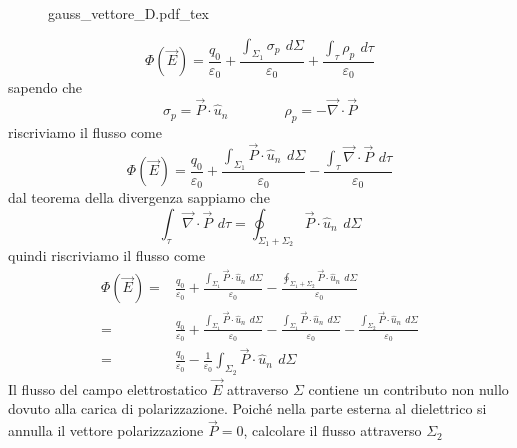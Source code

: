\documentclass[x11names]{report}
\newcommand{\incfig}[1]{%
	{#1.pdf_tex}
}
\begin{document}
\begin{figure}[H]
	\centering
	\incfig{gauss_vettore_D}
\end{figure}	
\[
\Phi(\vec{E}) = \frac{q_0}{\varepsilon_0} + \frac{\int_{\Sigma_1} \sigma_p \,\ d\Sigma}{\varepsilon_0} + \frac{\int_\tau \rho_p \,\ d\tau}{\varepsilon_0}
\]
sapendo che 
\[
\sigma_p = \vec{P}\cdot\hat{u}_n \qquad \qquad \rho_p = - \vec{\nabla}\cdot\vec{P}
\]
riscriviamo il flusso come 
\[
\Phi(\vec{E}) = \frac{q_0}{\varepsilon_0} + \frac{\int_{\Sigma_1} \vec{P}\cdot\hat{u}_n \,\ d\Sigma}{\varepsilon_0} - \frac{\int_\tau  \vec{\nabla}\cdot\vec{P} \,\ d\tau}{\varepsilon_0}
\]
dal teorema della divergenza sappiamo che 
\[
\int_\tau  \vec{\nabla}\cdot\vec{P} \,\ d\tau = \oint_{\Sigma_1 + \Sigma_2} \vec{P}\cdot\hat{u}_n \,\ d\Sigma
\]
quindi riscriviamo il flusso come 
\begin{align*}
	\Phi(\vec{E}) =& \frac{q_0}{\varepsilon_0} + \frac{\int_{\Sigma_1} \vec{P}\cdot\hat{u}_n \,\ d\Sigma}{\varepsilon_0} - \frac{ \oint_{\Sigma_1 + \Sigma_2} \vec{P}\cdot\hat{u}_n \,\ d\Sigma}{\varepsilon_0} \\
				  =& \frac{q_0}{\varepsilon_0} + \frac{\int_{\Sigma_1} \vec{P}\cdot\hat{u}_n \,\ d\Sigma}{\varepsilon_0} - \frac{ \int_{\Sigma_1} \vec{P}\cdot\hat{u}_n \,\ d\Sigma}{\varepsilon_0} - \frac{ \int_{\Sigma_2} \vec{P}\cdot\hat{u}_n \,\ d\Sigma}{\varepsilon_0} \\
				  =& \frac{q_0}{\varepsilon_0} - \frac{1}{\varepsilon_0} \int_{\Sigma_2} \vec{P}\cdot\hat{u}_n \,\ d\Sigma
\end{align*}
Il flusso del campo elettrostatico \(\vec{E}\) attraverso \(\Sigma\) contiene un contributo non nullo dovuto alla carica di polarizzazione. Poiché nella parte esterna al dielettrico si annulla il vettore polarizzazione \(\vec{P} = 0\), calcolare il flusso attraverso \(\Sigma_2\)
\end{document}
